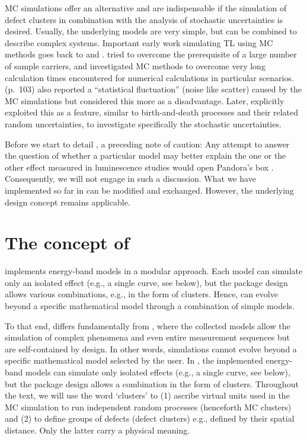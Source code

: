 MC simulations offer an alternative and are indispensable if the
simulation of defect clusters in combination with the analysis of
stochastic uncertainties is desired. Usually, the underlying models are
very simple, but can be combined to describe complex systems. Important
early work simulating TL using MC methods goes back to
\citet{Mandowski:1992ke} and \citet{Kulkarni:1994dr}.
\citet{Mandowski:1992ke} tried to overcome the prerequisite of a large
number of sample carriers, and \citet{Kulkarni:1994dr} investigated MC
methods to overcome very long calculation times encountered for
numerical calculations in particular scenarios. \citet{Kulkarni:1994dr}
(p.~103) also reported a ``statistical fluctuation'' (noise like
scatter) caused by the MC simulations but considered this more as a
disadvantage. Later, \citet{Pagonis:2020bt} explicitly exploited this as
a feature, similar to birth-and-death processes and their related random
uncertainties, to investigate specifically the stochastic uncertainties.

Before we start to detail , a preceding note of
caution: Any attempt to answer the question of whether a particular
model may better explain the one or the other effect measured in
luminescence studies would open Pandora's box
\citep[e.g.,][]{Horowitz:2017eo}. Consequently, we will not engage in
such a discussion. What we have implemented so far in
 can be modified and exchanged. However, the
underlying design concept remains applicable.

\hypertarget{the-concept-of}{%
\section{\texorpdfstring{The concept of
}{The concept of }}\label{the-concept-of}}

 implements energy-band models in a modular approach.
Each model can simulate only an isolated effect (e.g., a single curve,
see below), but the package design allows various combinations, e.g., in
the form of clusters. Hence,  can evolve beyond a
specific mathematical model through a combination of simple models.

To that end,  differs fundamentally from
, where the collected models allow the simulation of
complex phenomena and even entire measurement sequences
\citep{Friedrich:2016kia} but are self-contained by design. In other
words, simulations cannot evolve beyond a specific mathematical model
selected by the user. In , the implemented energy-band
models can simulate only isolated effects (e.g., a single curve, see
below), but the package design allows a combination in the form of
clusters. Throughout the text, we will use the word `clusters' to (1)
ascribe virtual units used in the MC simulation to run independent
random processes (henceforth MC clusters) and (2) to define groups of
defects (defect clusters) e.g., defined by their spatial distance. Only
the latter carry a physical meaning.

